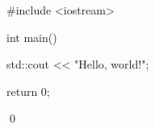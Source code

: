\begin{console}
#include <iostream>

int main()
{
    std::cout << "Hello, world!\n";

    return 0;
}
\end{console}
\qed
